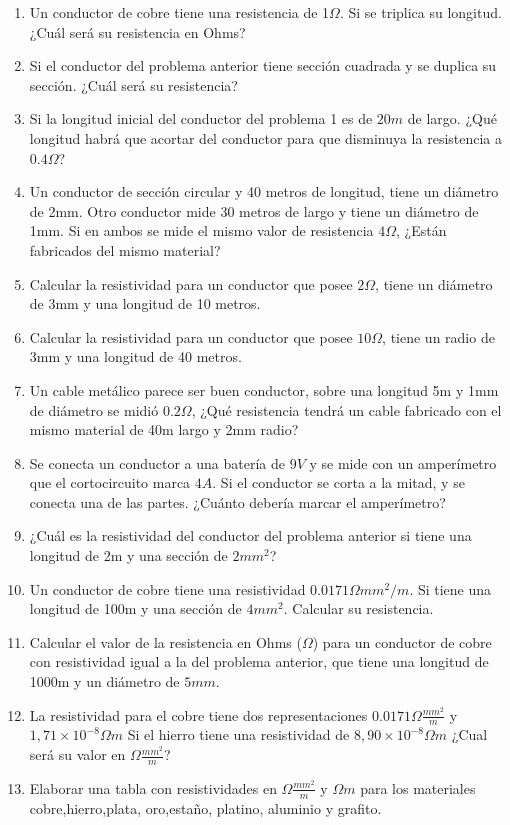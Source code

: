 \documentclass[../main]{subfiles}
\begin{document}
\begin{enumerate}
  \item Un conductor de cobre tiene una resistencia de 1$\Omega$. Si
    se triplica su longitud.  ¿Cuál será su resistencia en Ohms?
  \item Si el conductor del problema anterior tiene sección cuadrada
    y  se duplica su sección.  ¿Cuál será su resistencia?
  \item Si la longitud inicial del conductor del problema 1 es de
    $20m$ de largo.  ¿Qué longitud habrá que acortar del conductor
    para que disminuya la resistencia a $0.4\Omega$?
  \item Un conductor de sección circular y 40 metros de longitud,
    tiene un diámetro de 2mm. Otro conductor mide 30 metros de largo
    y tiene un diámetro de 1mm. Si en ambos se mide el mismo valor de
    resistencia $4\Omega$,  ¿Están fabricados del mismo material?
  \item Calcular la resistividad para un conductor que posee
    $2\Omega$, tiene un diámetro de 3mm y una longitud de 10 metros.
  \item Calcular la resistividad para un conductor que posee
    $10\Omega$, tiene un radio de 3mm y una longitud de 40 metros.
  \item Un cable metálico parece ser buen conductor, sobre una
    longitud 5m y 1mm de diámetro se midió $0.2\Omega$,  ¿Qué
    resistencia tendrá un cable fabricado con el mismo material de
    40m largo y 2mm radio?
  \item Se conecta un conductor a una batería de $9V$ y se mide con
    un amperímetro que el cortocircuito marca $4A$. Si el conductor
    se corta a la mitad, y se conecta una de las partes.  ¿Cuánto
    debería marcar el amperímetro?
  \item  ¿Cuál es la resistividad del conductor del problema anterior
    si tiene una longitud de 2m y una sección de $2mm^2$?
  \item Un conductor de cobre tiene una resistividad $0.0171 \Omega
    mm^2/m$. Si tiene una longitud de 100m y una sección de $4mm^2$.
    Calcular su resistencia.
  \item Calcular el valor de la resistencia en Ohms ($\Omega$) para un
    conductor de cobre con resistividad igual a la del problema
    anterior, que tiene una longitud de 1000m y un diámetro de $5mm$.
  \item La resistividad para el cobre tiene dos representaciones
    $0.0171 \Omega \frac{mm^2}{m}$ y $1,71 \times 10^{-8}\Omega m$ Si el
    hierro tiene una resistividad de $8,90 \times 10^{-8}\Omega m$  ¿Cual
    será su valor en $\Omega \frac{mm^2}{m}$?
  \item Elaborar una tabla con resistividades en $\Omega
    \frac{mm^2}{m}$ y $\Omega m$ para los materiales
    cobre,hierro,plata, oro,estaño, platino, aluminio y grafito.
\end{enumerate}
\end{document}
